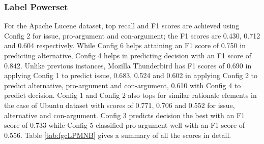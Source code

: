 \documentclass[a4paper,12pt,twoside]{report}
\begin{document}
\subsubsection{Label Powerset}
For the Apache Lucene dataset, top recall and F1 scores are achieved using Config 2 for issue, pro-argument and con-argument; the F1 scores are 0.430, 0.712 and 0.604 respectively. While Config 6 helps attaining an F1 score of 0.750 in predicting alternative, Config 4 helps in predicting decision with an F1 score of 0.842. Unlike previous instances, Mozilla Thunderbird has F1 scores of 0.690 in applying Config 1 to predict issue, 0.683, 0.524 and 0.602 in applying Config 2 to predict alternative, pro-argument and con-argument, 0.610 with Config 4 to predict decision. Config 1 and Config 2 also tops for similar rationale elements in the case of Ubuntu dataset with scores of 0.771, 0.706 and 0.552 for issue, alternative and con-argument. Config 3 predicts decision the best with an F1 score of 0.733 while Config 5 classified pro-argument well with an F1 score of 0.556. Table \ref{tab:fgcLPMNB} gives a summary of all the scores in detail.
\end{document}
